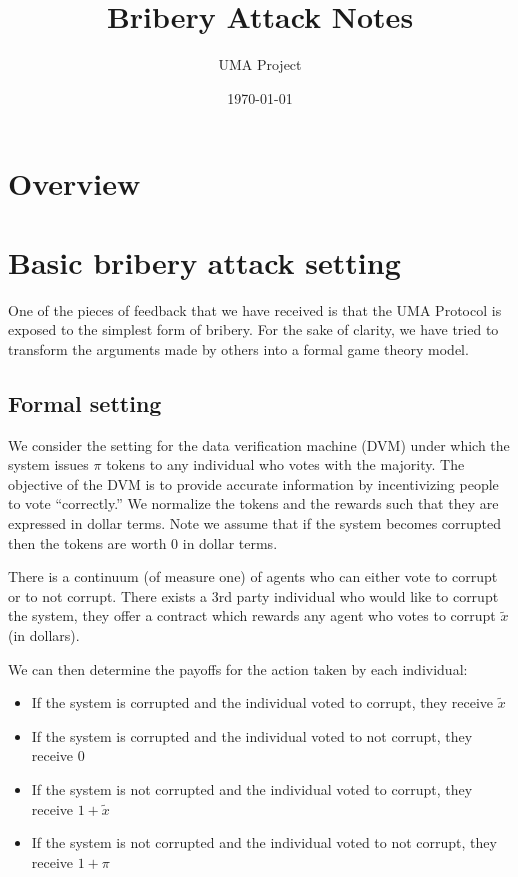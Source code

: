\documentclass[12pt]{article}
\title{Bribery Attack Notes}
\author{UMA Project}
\date{\today}
\begin{document}
\maketitle
\clearpage
\newpage

\section{Overview}

\section{Basic bribery attack setting}

  One of the pieces of feedback that we have received is that the UMA Protocol is exposed to the
  simplest form of bribery. For the sake of clarity, we have tried to transform the arguments made
  by others into a formal game theory model.

  \subsection{Formal setting} \label{bba_fs}

    We consider the setting for the data verification machine (DVM) under which the system issues
    $\pi$ tokens to any individual who votes with the majority. The objective of the DVM is to
    provide accurate information by incentivizing people to vote ``correctly.'' We normalize the
    tokens and the rewards such that they are expressed in dollar terms. Note we assume that if the
    system becomes corrupted then the tokens are worth 0 in dollar terms.

    There is a continuum (of measure one) of agents who can either vote to corrupt or to not
    corrupt. There exists a 3rd party individual who would like to corrupt the system, they offer
    a contract which rewards any agent who votes to corrupt $\tilde{x}$ (in dollars).

    We can then determine the payoffs for the action taken by each individual:

    \begin{itemize}
      \item If the system is corrupted and the individual voted to corrupt, they receive
        $\tilde{x}$
      \item If the system is corrupted and the individual voted to not corrupt, they receive $0$
      \item If the system is not corrupted and the individual voted to corrupt, they receive
        $1 + \tilde{x}$
      \item If the system is not corrupted and the individual voted to not corrupt, they receive
        $1 + \pi$
    \end{itemize}
\end{document}
